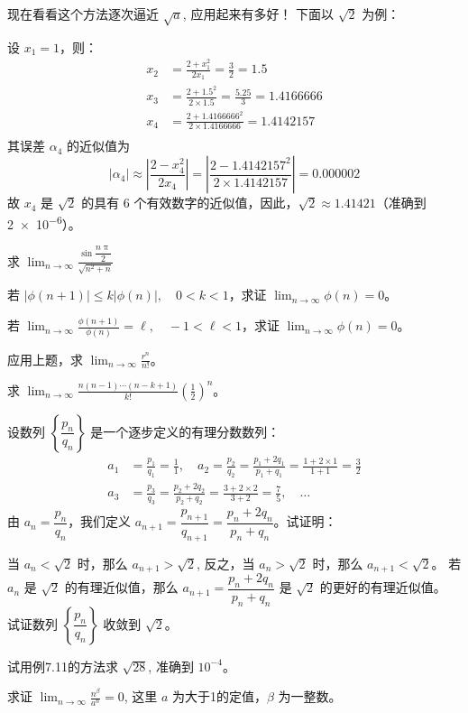 \bigskip
现在看看这个方法逐次逼近 $\sqrt{a}$, 应用起来有多好！
下面以 $\sqrt{2}$ 为例：

设 $x_1=1$，则：
\[\begin{split}
    x_2&=\frac{2+x^2_1}{2x_1}=\frac{3}{2}=1.5\\
    x_3&=\frac{2+1.5^2}{2\times 1.5}=\frac{5.25}{3}=1.4166666   \\
    x_4&=\frac{2+1.4166666^2}{2\times 1.4166666}=1.4142157   \\
\end{split}\]
其误差 $\alpha_4$ 的近似值为
\[|\alpha_4|\approx \left|\frac{2-x^2_4}{2x_4}\right|=\left|\frac{2-1.4142157^2}{2\times 1.4142157}\right|=0.000002\]
故 $x_4$ 是 $\sqrt{2}$ 的具有 6 个有效数字的近似值，因此，$\sqrt{2}\approx 1.41421$（准确到 \num{2e-6}）。

\begin{Exercise}
\begin{question}
  \item 求 $\displaystyle \lim_{n\to\infty}\frac{\sin\dfrac{n\uppi}{2}}{\sqrt{n^2+n}} $
  \item 若 $|\phi(n+1)|\leqslant k|\phi(n)|,\quad 0<k<1$，求证 $\displaystyle\lim_{n\to\infty}\phi(n)=0$。
  \item 若 $\displaystyle \lim_{n\to\infty}\frac{\phi(n+1)}{\phi(n)}=\ell,\quad -1<\ell<1$，求证 $\displaystyle\lim_{n\to\infty}\phi(n)=0$。
  \item 应用上题，求 $\displaystyle\lim_{n\to\infty}\frac{r^n}{n!}$。
  \item 求 $\displaystyle\lim_{n\to\infty}\frac{n(n-1)\cdots (n-k+1)}{k!}\left(\frac{1}{2}\right)^n$。
  \item 设数列 $\left\{\dfrac{p_n}{q_n}\right\}$ 是一个逐步定义的有理分数数列：
\[\begin{split}
    a_1&=\frac{p_1}{q_1}=\frac{1}{1},\quad a_2=\frac{p_2}{q_2}=\frac{p_1+2q_1}{p_1+q_1}=\frac{1+2\times 1}{1+1}=\frac{3}{2}\\
a_3&=\frac{p_3}{q_3}=\frac{p_2+2q_2}{p_2+q_2}=\frac{3+2\times2}{3+2}=\frac{7}{5},\quad \ldots
\end{split}\]
由 $a_n=\dfrac{p_n}{q_n}$，我们定义 $a_{n+1}=\dfrac{p_{n+1}}{q_{n+1}}=\dfrac{p_n+2q_n}{p_n+q_n}$。试证明： 
  \begin{tasks}
    \task 当 $a_n<\sqrt{2}$ 时，那么 $a_{n+1}>\sqrt{2}$, 反之，当 $a_n>\sqrt{2}$ 时，那么 $a_{n+1}<\sqrt{2}$。
    \task 若 $a_n$ 是 $\sqrt{2}$ 的有理近似值，那么 $a_{n+1}=\dfrac{p_n+2q_n}{p_n+q_n}$ 是 $\sqrt{2}$ 的更好的有理近似值。
    \task 试证数列 $\left\{\dfrac{p_n}{q_n}\right\}$ 收敛到 $\sqrt{2}$。
\end{tasks}
  \item 试用例7.11的方法求 $\sqrt{28}$, 准确到 $10^{-4}$。
  \item 求证 $\displaystyle\lim_{n\to\infty}\frac{n^{\beta}}{a^n}=0$, 这里 $a$ 为大于1的定值，$\beta$ 为一整数。
\end{question}
\end{Exercise}


